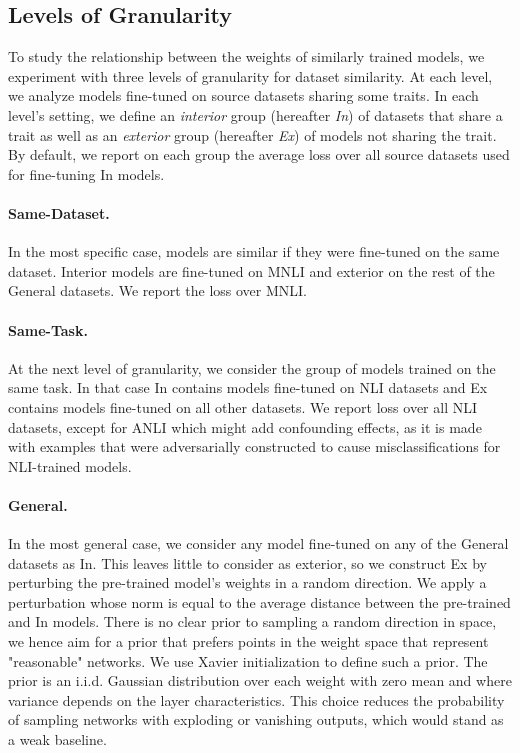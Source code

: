 \documentclass[nohyperref]{article}
\theoremstyle{plain}
\theoremstyle{definition}
\theoremstyle{remark}
\begin{document}
\subsection{Levels of Granularity}\label{sec:granularity_levels} 
To study the relationship between the weights of similarly trained models, we experiment with three levels of granularity for dataset similarity. At each level, we analyze models fine-tuned on source datasets sharing some traits. In each level's setting, we define an \emph{interior} group (hereafter \emph{In}) of datasets that share a trait as well as an \emph{exterior} group (hereafter \emph{Ex}) of models not sharing the trait. By default, we report on each group the average loss over all source datasets used for fine-tuning In models.

\paragraph{Same-Dataset.} \label{sec:behavior_per_seed}
In the most specific case, models are similar if they were fine-tuned on the same dataset. Interior models are fine-tuned on MNLI \citep{williams-etal-2018-broad} and exterior on the rest of the General datasets. We report the loss over MNLI. 

\paragraph{Same-Task.} At the next level of granularity, we consider the group of models trained on the same task. In that case In contains models fine-tuned on NLI datasets and Ex contains models fine-tuned on all other datasets. We report loss over all NLI datasets, except for ANLI which might add confounding effects, as it is made with examples that were adversarially constructed to cause misclassifications for NLI-trained models. \label{sec:behavior_per_task}

\paragraph{General.} In the most general case, we consider any model fine-tuned on any of the General datasets as In. This leaves little to consider as exterior, so we construct Ex by perturbing the pre-trained model's weights in a random direction. We apply a perturbation whose norm is equal to the average distance between the pre-trained and In models. There is no clear prior to sampling a random direction in space, we hence aim for a prior that prefers points in the weight space that represent "reasonable" networks. We use Xavier initialization \citep{xavierInit} to define such a prior. The prior is an i.i.d. Gaussian distribution over each weight with zero mean and where variance depends on the layer characteristics. This choice reduces the probability of sampling networks with exploding or vanishing outputs, which would stand as a weak baseline.
 \label{sec:behavior_per_fine-tuning}
\end{document}

